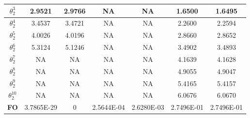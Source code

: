 \begin{table}
{\begin{tabular}{|c|c|c|c|c|c|c|}
		$\theta^3_2$                     & 2.9521&2.9766     & NA&NA         & 1.6500 &  1.6495   \\
		\hline
		$\theta^4_2$                     & 3.4537&3.4721     & NA & NA       & 2.2600 & 2.2594    \\
		\hline
		$\theta^5_2$                     & 4.0026&4.0196    & NA & NA       & 2.8660  &  2.8652  \\
		\hline
		$\theta^6_2$                     & 5.3124&5.1246     & NA &NA        & 3.4902 &  3.4893   \\
		\hline
		$\theta^7_2$                     & NA    &  NA   & NA & NA       & 4.1639 & 4.1628    \\
		\hline
		$\theta^8_2$                     & NA    &  NA   & NA & NA       & 4.9055 &  4.9047   \\
		\hline
		$\theta^9_2$                     & NA    &   NA  & NA & NA       & 5.4165 & 5.4157    \\
		\hline
		$\theta^{10}_2$                     & NA &     NA   & NA &NA        & 6.0676 & 6.0670    \\
		\hline
		\textbf{FO}                    & 3.7865E-29 &0&2.5644E-04&2.6280E-03& 2.7496E-01& 2.7496E-01\\
		\hline
	\end{tabular}
}
\end{table}

